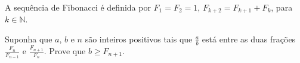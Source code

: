 A sequência de Fibonacci é definida por $F_1=F_2=1$, $F_{k+2}=F_{k+1}+F_k$, para $k\in\mathbb{N}$.

Suponha que $a$, $b$ e $n$ são inteiros positivos tais que $\frac ab$ está entre as duas frações $\frac{F_n}{F_{n-1}}$ e $\frac{F_{n+1}}{F_{n}}$.
Prove que $b\ge F_{n+1}$.
